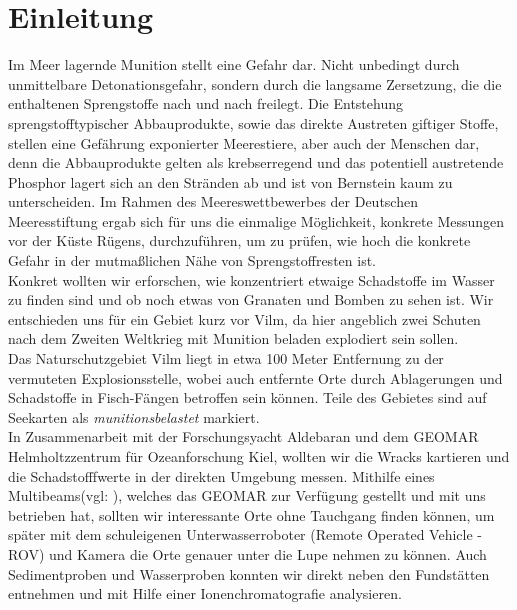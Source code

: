  

\chapter[Einleitung]{Einleitung}

Im Meer lagernde Munition stellt eine Gefahr dar. Nicht unbedingt durch unmittelbare Detonationsgefahr, 
sondern durch die langsame Zersetzung, die die enthaltenen Sprengstoffe nach und nach 
freilegt\cite{zeitbomben}. Die Entstehung sprengstofftypischer Abbauprodukte, sowie das direkte Austreten 
giftiger Stoffe, stellen eine Gefährung exponierter Meerestiere, aber auch der Menschen dar\cite{spread}, denn die
Abbauprodukte gelten als krebserregend und das potentiell austretende Phosphor lagert sich an den Stränden 
ab und ist von Bernstein kaum zu unterscheiden.  Im Rahmen des Meereswettbewerbes der Deutschen Meeresstiftung ergab sich für uns die einmalige Möglichkeit, konkrete Messungen vor der Küste Rügens, durchzuführen, um zu prüfen, wie hoch die konkrete Gefahr in der mutmaßlichen Nähe von Sprengstoffresten ist.\\

Konkret wollten wir erforschen, wie konzentriert etwaige Schadstoffe im Wasser zu finden sind und 
ob noch etwas von Granaten und Bomben zu sehen ist. Wir entschieden uns für ein Gebiet kurz vor Vilm,
da hier angeblich zwei Schuten nach dem Zweiten Weltkrieg mit Munition beladen explodiert sein sollen\cite{schiffsschicksale}.\\

Das Naturschutzgebiet Vilm liegt in etwa 100 Meter Entfernung zu der vermuteten Explosionsstelle, wobei auch 
entfernte Orte durch Ablagerungen und Schadstoffe in Fisch-Fängen betroffen sein können. Teile des Gebietes sind auf Seekarten als \emph{munitionsbelastet} markiert.\\

In Zusammenarbeit mit der Forschungsyacht Aldebaran und dem GEOMAR Helmholtzzentrum für Ozeanforschung Kiel, wollten wir die Wracks kartieren und die Schadstofffwerte in
der direkten Umgebung messen. 
Mithilfe eines 
\glqq Multibeams\grqq (vgl: \cite{multib}), welches das GEOMAR zur Verfügung gestellt und mit uns betrieben hat, sollten wir interessante Orte ohne Tauchgang finden können, um später mit dem schuleigenen Unterwasserroboter (Remote Operated Vehicle - ROV)  und Kamera die Orte genauer unter die Lupe nehmen zu können. Auch Sedimentproben und Wasserproben konnten wir direkt neben den Fundstätten entnehmen und mit Hilfe einer Ionenchromatografie analysieren.\\

